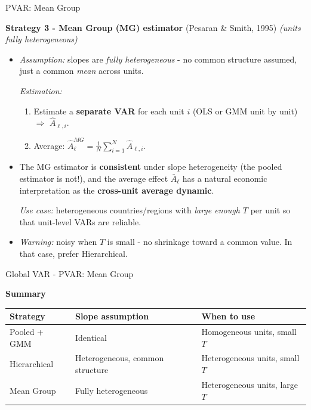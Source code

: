 \documentclass{beamer}
\begin{document}
\begin{frame}{PVAR: Mean Group}
\footnotesize

\textbf{Strategy 3 - Mean Group (MG) estimator} (Pesaran \& Smith, 1995) \quad\textit{(units fully heterogeneous)}

\smallskip

\begin{itemize}
    \item \textit{Assumption:} slopes are \emph{fully heterogeneous} - no common structure assumed, just a common \emph{mean} across units.


\textit{Estimation:}
\begin{enumerate}
\footnotesize
  \item Estimate a \textbf{separate VAR} for each unit $i$ (OLS or GMM unit by unit) $\Rightarrow$ $\hat A_{\ell,i}$.
  \item Average: $\displaystyle\hat A_\ell^{MG} = \frac{1}{N}\sum_{i=1}^N \hat A_{\ell,i}$.
\end{enumerate}

\item The MG estimator is \textbf{consistent} under slope heterogeneity (the pooled estimator is not!), and the average effect $\bar A_\ell$ has a natural economic interpretation as the \textbf{cross-unit average dynamic}.


\tem \textit{Use case:} heterogeneous countries/regions with \emph{large enough $T$} per unit so that unit-level VARs are reliable.
\smallskip

\item \textit{Warning:} noisy when $T$ is small - no shrinkage toward a common value. In that case, prefer Hierarchical.

\end{itemize}

\end{frame}


\begin{frame}{Global VAR - PVAR: Mean Group}

\textbf{Summary}
\bigskip

\begin{tabular}{p{}p{}p{}}
\hline
\textbf{Strategy} & \textbf{Slope assumption} & \textbf{When to use} \\
\hline
Pooled + GMM & Identical & Homogeneous units, small $T$ \\
Hierarchical & Heterogeneous, common structure & Heterogeneous units, small $T$ \\
Mean Group & Fully heterogeneous & Heterogeneous units, large $T$ \\
\hline
\end{tabular}

\end{frame}
\end{document}
